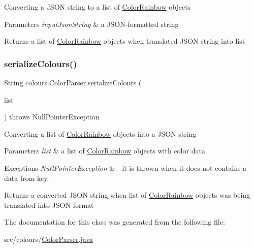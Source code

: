 Converting a J\+S\+ON string to a list of \hyperlink{classcolours_1_1_color_rainbow}{Color\+Rainbow} objects 
\begin{DoxyParams}{Parameters}
{\em input\+Json\+String} & a J\+S\+O\+N-\/formatted string \\
\hline
\end{DoxyParams}
\begin{DoxyReturn}{Returns}
a list of \hyperlink{classcolours_1_1_color_rainbow}{Color\+Rainbow} objects when translated J\+S\+ON string into list 
\end{DoxyReturn}
\mbox{\label{classcolours_1_1_color_parser_a3a8b5f6c8bd9045b63fd8e162f3c96d3}} 
\subsubsection{\texorpdfstring{serialize\+Colours()}{serializeColours()}}
{\footnotesize\ttfamily String colours.\+Color\+Parser.\+serialize\+Colours (\begin{DoxyParamCaption}\item[{List$<$ \hyperlink{classcolours_1_1_color_rainbow}{Color\+Rainbow} $>$}]{list }\end{DoxyParamCaption}) throws Null\+Pointer\+Exception\hspace{0.3cm}{\ttfamily [inline]}}

Converting a list of \hyperlink{classcolours_1_1_color_rainbow}{Color\+Rainbow} objects into a J\+S\+ON string 
\begin{DoxyParams}{Parameters}
{\em list} & a list of \hyperlink{classcolours_1_1_color_rainbow}{Color\+Rainbow} objects with color data \\
\hline
\end{DoxyParams}

\begin{DoxyExceptions}{Exceptions}
{\em Null\+Pointer\+Exception} & -\/ it is thrown when it does not contains a data from key. \\
\hline
\end{DoxyExceptions}
\begin{DoxyReturn}{Returns}
a converted J\+S\+ON string when list of \hyperlink{classcolours_1_1_color_rainbow}{Color\+Rainbow} objects was being translated into J\+S\+ON format 
\end{DoxyReturn}


The documentation for this class was generated from the following file\+:\begin{DoxyCompactItemize}
\item 
src/colours/\hyperlink{_color_parser_8java}{Color\+Parser.\+java}\end{DoxyCompactItemize}
